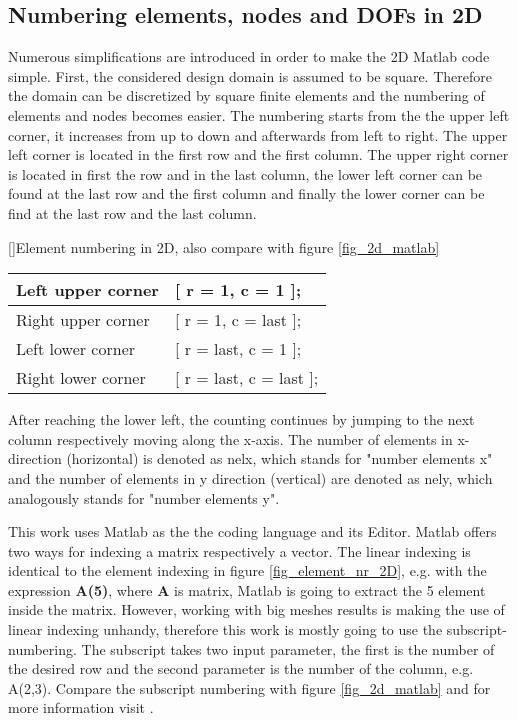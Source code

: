 \subsection{Numbering elements, nodes and DOFs in 2D}
Numerous simplifications are introduced in order to make the 2D Matlab code simple.
First, the considered design domain is assumed to be square. 
Therefore the domain can be discretized by square finite elements and the numbering of elements and nodes becomes easier. The numbering starts from the the upper left corner, it increases from up to down and afterwards from left to right.
The upper left corner is located in the first row and the first column. The upper right corner is located in first the row
and in the last column, the lower left corner can be found at the last  row and the first column and finally the lower corner can be find at the last row and the last column.\\

\begin{minipage}{0.5\textwidth}
[]{Element numbering in 2D, also compare with figure \ref{fig_2d_matlab}}
\begin{center}
\begin{tabular}{|l|l|}
\hline 
Left upper corner& [ r = 1, c = 1 ];\\
\hline 
 Right upper corner& [ r = 1, c = last ];\\
\hline 
Left lower corner& [ r = last, c = 1 ];\\
\hline 
 Right lower corner& [ r = last, c = last ];\\
\hline 
\end{tabular} 
\end{center}
\end{minipage}
\begin{minipage}[t]{0.4\textwidth}
 After reaching the lower left, the counting continues by jumping to the next column respectively moving along the x-axis.
 The number of elements in x-direction (horizontal) is denoted as nelx, which stands for "number elements x" and the number of elements
 in y direction (vertical) are denoted as nely, which analogously stands for "number elements y".\\
\end{minipage}
This work uses Matlab as the the coding language and its Editor. Matlab offers two ways for indexing a matrix respectively a vector. The linear indexing is identical to the element indexing in figure \ref{fig_element_nr_2D}, e.g. with the expression \textbf{A(5)}, where\textbf{ A} is matrix, Matlab is going to extract the 5 element inside the matrix. However, working with big meshes results is making the use of linear indexing unhandy, therefore this work is mostly going to use the subscript-numbering. The subscript takes two input parameter, the first is the number of the desired row and the second parameter is the number of the column, e.g. A(2,3). Compare the subscript numbering with figure \ref{fig_2d_matlab}
and for more information visit \cite{.matlab_index_ref}.  \newpage

